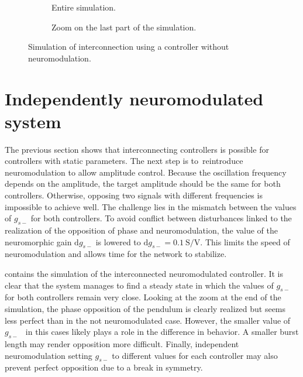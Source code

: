 \begin{figure}[!htbp]
    \centering
    \begin{subfigure}[t]{\textwidth}
        \centering
        \caption{Entire simulation.}
    \end{subfigure}
    
    \begin{subfigure}[b]{\textwidth}
        \centering
        \caption{Zoom on the last part of the simulation.}
    \end{subfigure}
    \caption{Simulation of interconnection using a controller without neuromodulation.}
    \label{fig:hco_simple}
\end{figure}

\section{Independently neuromodulated system}

The previous section shows that interconnecting controllers is possible for controllers with static parameters.
The next step is to reintroduce neuromodulation to allow amplitude control.
Because the oscillation frequency depends on the amplitude, the target amplitude should be the same for both controllers.
Otherwise, opposing two signals with different frequencies is impossible to achieve well.
The challenge lies in the mismatch between the values of $g_{s-}$ for both controllers.
To avoid conflict between disturbances linked to the realization of the opposition of phase and neuromodulation, the value of the neuromorphic gain $\mathrm{d}g_{s-}$ is lowered to $\mathrm{d}g_{s-} = \qty{0.1}{\siemens\per\volt}$.
This limits the speed of neuromodulation and allows time for the network to stabilize.

 contains the simulation of the interconnected neuromodulated controller.
It is clear that the system manages to find a steady state in which the values of $g_{s-}$ for both controllers remain very close.
Looking at the zoom at the end of the simulation, the phase opposition of the pendulum is clearly realized but seems less perfect than in the not neuromodulated case.
However, the smaller value of $g_{s-}$  in this cases likely plays a role in the difference in behavior.
A smaller burst length may render opposition more difficult.
Finally, independent neuromodulation setting $g_{s-}$ to different values for each controller may also prevent perfect opposition due to a break in symmetry.

